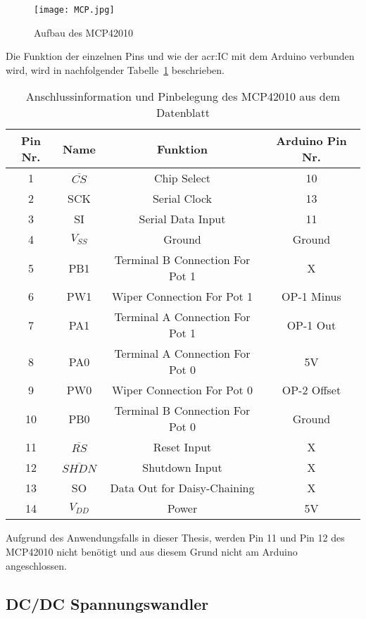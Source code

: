 \begin{figure}[H]
	\centering
	\texttt{[image: MCP.jpg]}
	\caption[Aufbau des MCP42010]{Aufbau des MCP42010} 
	\cite{MCP42}
	\label{fig:MCP}
\end{figure}

Die Funktion der einzelnen Pins und wie der \gls{acr:IC} mit dem Arduino verbunden wird, wird in nachfolgender Tabelle~\ref{tab:pinmcp} beschrieben. 

\begin{table}[htb]
	\begin{center}
		\begin{tabular}[H]{cccc}	
			\toprule
			\textbf{Pin Nr.} & \textbf{Name}  &\textbf{Funktion} & \textbf{Arduino Pin Nr.} \\
			\midrule
			1 & $\overline{CS}$ & Chip Select &  10 \\
			2 & SCK & Serial Clock &  13 \\
			3 & SI & Serial Data Input&  11 \\
			4 & $V_{SS}$ & Ground &  Ground \\
			5 & PB1 & Terminal B Connection For Pot 1 & X \\
			6 & PW1 & Wiper Connection For Pot 1 &  OP-1 Minus \\
			7 & PA1& Terminal A Connection For Pot 1 &  OP-1 Out  \\
			8 & PA0& Terminal A Connection For Pot 0 &  5V \\
			9 & PW0& Wiper Connection For Pot 0 & OP-2 Offset \\
			10 & PB0 & Terminal B Connection For Pot 0 &  Ground \\
			11 & $\overline{RS}$ & Reset Input & X  \\
			12 & $\overline{SHDN}$ & Shutdown Input &X\\
			13 & SO & Data Out for Daisy-Chaining & X \\
			14 & $V_{DD}$ & Power & 5V \\
			\bottomrule
		\end{tabular}
		\caption{Anschlussinformation und Pinbelegung des MCP42010 aus dem Datenblatt}
		\label{tab:pinmcp}
	\end{center}
\end{table}

Aufgrund des Anwendungsfalls in dieser Thesis, werden Pin 11 und Pin 12 des MCP42010 nicht benötigt und aus diesem Grund nicht am Arduino angeschlossen. 

\subsection{DC/DC Spannungswandler}
\label{subsec:dcdc}

